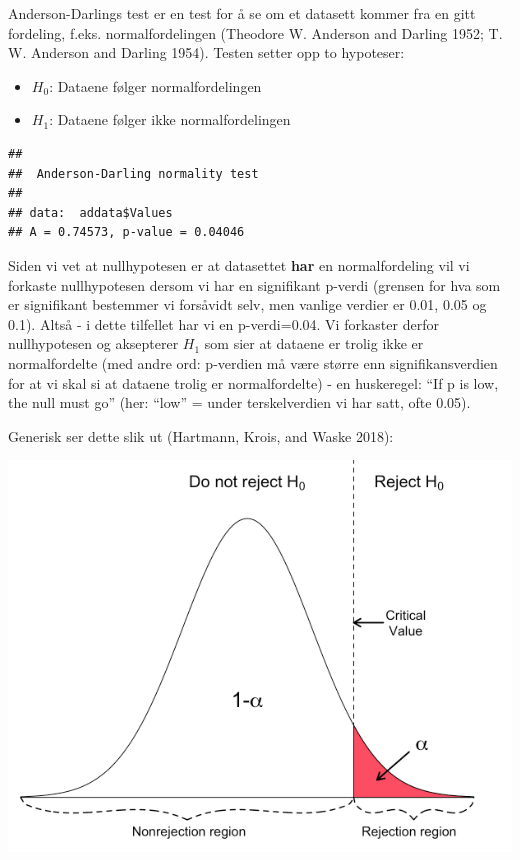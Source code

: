 \documentclass[
]{article}
\providecommand{\tightlist}{%
  \setlength{\itemsep}{0pt}\setlength{\parskip}{0pt}}
\begin{document}
Anderson-Darlings test er en test for å se om et datasett kommer fra en
gitt fordeling, f.eks. normalfordelingen (Theodore W. Anderson and
Darling 1952; T. W. Anderson and Darling 1954). Testen setter opp to
hypoteser:

\begin{itemize}
\tightlist
\item
  \(H_0\): Dataene følger normalfordelingen
\item
  \(H_1\): Dataene følger ikke normalfordelingen
\end{itemize}

\begin{verbatim}
## 
##  Anderson-Darling normality test
## 
## data:  addata$Values
## A = 0.74573, p-value = 0.04046
\end{verbatim}

Siden vi vet at nullhypotesen er at datasettet \textbf{har} en
normalfordeling vil vi forkaste nullhypotesen dersom vi har en
signifikant p-verdi (grensen for hva som er signifikant bestemmer vi
forsåvidt selv, men vanlige verdier er 0.01, 0.05 og 0.1). Altså - i
dette tilfellet har vi en p-verdi=0.04. Vi forkaster derfor
nullhypotesen og aksepterer \(H_1\) som sier at dataene er trolig ikke
er normalfordelte (med andre ord: p-verdien må være større enn
signifikansverdien for at vi skal si at dataene trolig er
normalfordelte) - en huskeregel: ``If p is low, the null must go'' (her:
``low'' = under terskelverdien vi har satt, ofte 0.05).

Generisk ser dette slik ut (Hartmann, Krois, and Waske 2018):

\includegraphics{Hartman1.png}
\end{document}
